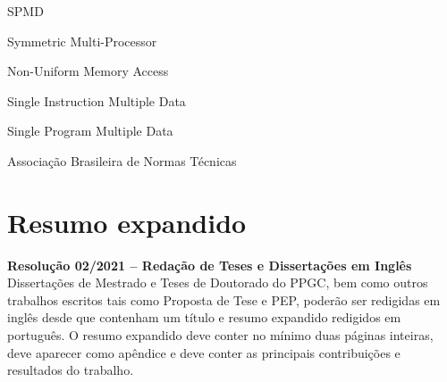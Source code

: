 \documentclass[ppgc,tese,english]{iiufrgs}
\begin{document}
\begin{listofabbrv}{SPMD}
        \item[SMP] Symmetric Multi-Processor
        \item[NUMA] Non-Uniform Memory Access
        \item[SIMD] Single Instruction Multiple Data
        \item[SPMD] Single Program Multiple Data
        \item[ABNT] Associação Brasileira de Normas Técnicas
\end{listofabbrv}


\listoffigures

\listoftables

\tableofcontents



% 
% 
% 
% 
% 
% 
% 




\appendix

\chapter{Resumo expandido}

\noindent
\textbf{Resolução 02/2021 -- Redação de Teses e Dissertações em Inglês}
Dissertações de Mestrado e Teses de Doutorado do PPGC, bem como outros
trabalhos escritos tais como Proposta de Tese e PEP, poderão ser
redigidas em inglês desde que contenham um título e resumo expandido
redigidos em português. O resumo expandido deve conter no mínimo duas
páginas inteiras, deve aparecer como apêndice e deve conter as
principais contribuições e resultados do trabalho.
\end{document}
